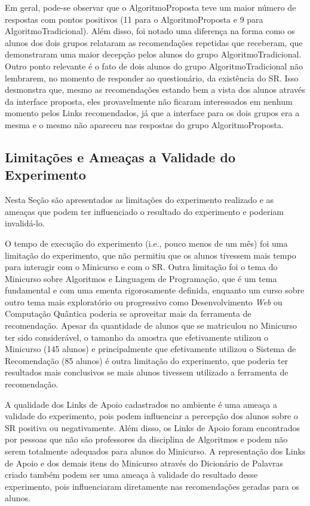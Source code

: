 Em geral, pode-se observar que o AlgoritmoProposta teve um maior número de respostas com pontos positivos (11 para
o AlgoritmoProposta e 9 para AlgoritmoTradicional). Além disso, foi notado uma diferença na forma como os alunos dos
dois grupos relataram as  recomendações repetidas que receberam, que demonstraram uma maior decepção pelos alunos
do grupo AlgoritmoTradicional. Outro ponto relevante é o fato de dois alunos do grupo AlgoritmoTradicional não lembrarem,
no momento de responder ao questionário, da existência do SR. Isso desmonstra que, mesmo as recomendações estando bem a
vista dos alunos através da interface proposta, eles provavelmente não ficaram interessados em nenhum momento pelos
Links recomendados, já que a interface para os dois grupos era a mesma e o mesmo não apareceu nas respostas do grupo
AlgoritmoProposta.

\subsection{Limitações e Ameaças a Validade do Experimento}\label{subsection:ameacas-a-validade}

Nesta Seção são apresentados as limitações do experimento realizado e as ameaças que podem ter influenciado o resultado
do experimento e poderiam invalidá-lo.

O tempo de execução do experimento (i.e., pouco menos de um mês) foi uma limitação do experimento, que não permitiu que
os alunos tivessem mais tempo para interagir com o Minicurso e com o SR. Outra limitação foi o tema do Minicurso sobre
Algoritmos e Linguagem de Programação, que é um tema fundamental e com uma ementa rigorosamente definida, enquanto um curso
sobre outro tema mais exploratório ou progressivo como Desenvolvimento \textit{Web} ou Computação Quântica poderia se aproveitar
mais da ferramenta de recomendação. Apesar da quantidade de alunos que se matriculou no Minicurso ter sido considerável,
o tamanho da amostra que efetivamente utilizou o Minicurso (145 alunos) e principalmente que efetivamente utilizou o Sistema de
Recomendação (85 alunos) é outra limitação do experimento, que poderia ter resultados mais conclusivos se mais alunos tivessem
utilizado a ferramenta de recomendação.

A qualidade dos Links de Apoio cadastrados no ambiente \adaptwebspace é uma ameaça a validade do experimento, pois podem
influenciar a percepção dos alunos sobre o SR positiva ou negativamente. Além disso, os Links de Apoio foram encontrados
por pessoas que não são professores da disciplina de Algoritmos e podem não serem totalmente adequados para alunos do Minicurso.
A representação dos Links de Apoio e dos demais itens do Minicurso através do Dicionário de Palavras criado também
podem ser uma ameaça à validade do resultado desse experimento, pois influenciaram diretamente nas recomendações geradas
para os alunos.

